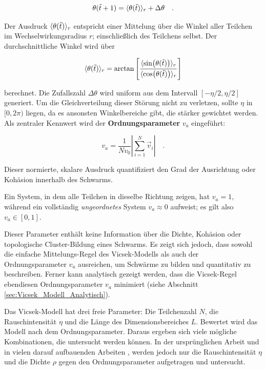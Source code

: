 \documentclass{solutionclass}
\begin{document}
\begin{equation}
    \theta(\Tilde{t}+1)=\langle\theta(\Tilde{t})\rangle_r+\Delta \theta \quad .
    \label{eq:next_angle}
\end{equation}

Der Ausdruck $\langle\theta(\Tilde{t})\rangle_r$ entspricht einer Mittelung über die Winkel aller Teilchen im Wechselwirkungsradius $r$; einschließlich des Teilchens selbst. Der durchschnittliche Winkel wird über

\begin{equation}
    \langle\theta(\Tilde{t})\rangle_r = \arctan \left[ \frac{\langle\sin (\theta(\Tilde{t}))\rangle_r}{\langle\cos (\theta(\Tilde{t}))\rangle_r} \right]
    \label{eq:vicsek_rule}
\end{equation}

berechnet. Die Zufallszahl $\Delta \theta$ wird uniform aus dem Intervall $[-\eta / 2, \eta / 2]$ generiert. Um die Gleichverteilung dieser Störung nicht zu verletzen, sollte $\eta$ in $[0, 2 \pi)$ liegen, da es ansonsten Winkelbereiche gibt, die stärker gewichtet werden.\\

Als zentraler Kennwert wird der \textbf{Ordnungsparameter} $v_a$ eingeführt:

\begin{equation}
    v_a=\frac{1}{N v_0}\left|\sum_{i=1}^N \vec{v}_i\right| \quad .
    \label{eq:ordnungsparameter_vicsek}
\end{equation}

Dieser normierte, skalare Ausdruck quantifiziert den Grad der Ausrichtung oder Kohäsion innerhalb des Schwarms.

Ein System, in dem alle Teilchen in dieselbe Richtung zeigen, hat $v_a = 1$, während ein vollständig \textit{ungeordnetes} System $v_a \approx 0$ aufweist; es gilt also $v_a \in [0,1]$.

Dieser Parameter enthält keine Information über die Dichte, Kohäsion oder topologische Cluster-Bildung eines Schwarms. Es zeigt sich jedoch, dass sowohl die einfache Mittelungs-Regel des Vicsek-Modells als auch der Ordnungsparameter $v_a$ ausreichen, um Schwärme zu bilden und quantitativ zu beschreiben. Ferner kann analytisch gezeigt werden, dass die Vicsek-Regel ebendiesen Ordnungsparameter $v_a$ minimiert (siehe Abschnitt \ref{sec:Vicsek_Modell_Analytisch}).

\divider

Das Vicsek-Modell hat drei freie Parameter: Die Teilchenzahl $N$, die Rauschintensität $\eta$ und die Länge des Dimensionsbereiches $L$. Bewertet wird das Modell nach dem Ordnungsparameter. Daraus ergeben sich viele mögliche Kombinationen, die untersucht werden können. In der ursprünglichen Arbeit \cite{vicsek1995} und in vielen darauf aufbauenden Arbeiten \cite{PhaseTransitions2013}, \cite{Aldana_2007} werden jedoch nur die Rauschintensität $\eta$ und die Dichte $\rho$ gegen den Ordnungsparameter aufgetragen und untersucht.
\end{document}
